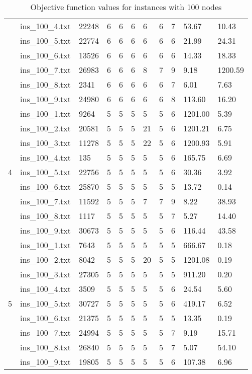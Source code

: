 \begin{table}[]
\begin{tabular}{lllllllllll}
& ins\_100\_4.txt & 22248 & 6 & 6 & 6 & 6  & 6  & 7 &53.67  &    10.43	\\
& ins\_100\_5.txt & 22774 & 6 & 6 & 6 & 6  & 6  & 6 &21.99  &    24.31	\\
& ins\_100\_6.txt & 13526 & 6 & 6 & 6 & 6  & 6  & 6 &14.33  &    18.33	\\
& ins\_100\_7.txt & 26983 & 6 & 6 & 6 & 8  & 7  & 9 &9.18   &    1200.59	\\
& ins\_100\_8.txt & 2341  & 6 & 6 & 6 & 6  & 6  & 7 &6.01   &    7.63	\\
& ins\_100\_9.txt & 24980 & 6 & 6 & 6 & 6  & 6  & 8 &113.60 &    16.20	\\
\hline 
\multirow{9}{*}{4}
& ins\_100\_1.txt & 9264  & 5 & 5 & 5 & 5  & 5  & 6 &1201.00&	5.39 \\
& ins\_100\_2.txt & 20581 & 5 & 5 & 5 & 21 & 5  & 6 &1201.21&	6.75 \\
& ins\_100\_3.txt & 11278 & 5 & 5 & 5 & 22 & 5  & 6 &1200.93&	5.91 \\
& ins\_100\_4.txt & 135   & 5 & 5 & 5 & 5  & 5  & 6 &165.75 &    6.69 \\
& ins\_100\_5.txt & 22756 & 5 & 5 & 5 & 5  & 5  & 6 &30.36  &    3.92 \\
& ins\_100\_6.txt & 25870 & 5 & 5 & 5 & 5  & 5  & 5 &13.72  &    0.14 \\
& ins\_100\_7.txt & 11592 & 5 & 5 & 5 & 7  & 7  & 9 &8.22   &    38.93\\
& ins\_100\_8.txt & 1117  & 5 & 5 & 5 & 5  & 5  & 7 &5.27   &    14.40\\
& ins\_100\_9.txt & 30673 & 5 & 5 & 5 & 5  & 5  & 6 &116.44 &    43.58\\
\hline 
\multirow{9}{*}{5}
& ins\_100\_1.txt & 7643  & 5 & 5 & 5 & 5  & 5  & 5 &666.67	&0.18	\\
& ins\_100\_2.txt & 8042  & 5 & 5 & 5 & 20 & 5  & 5 &1201.08	&0.19	\\
& ins\_100\_3.txt & 27305 & 5 & 5 & 5 & 5  & 5  & 5 &911.20	&0.20	\\
& ins\_100\_4.txt & 3509  & 5 & 5 & 5 & 5  & 5  & 6 &24.54	&5.60	\\
& ins\_100\_5.txt & 30727 & 5 & 5 & 5 & 5  & 5  & 6 &419.17	&6.52	\\
& ins\_100\_6.txt & 21375 & 5 & 5 & 5 & 5  & 5  & 5 &13.35	&0.19	\\
& ins\_100\_7.txt & 24994 & 5 & 5 & 5 & 5  & 5  & 7 &9.19	&15.71	\\
& ins\_100\_8.txt & 26840 & 5 & 5 & 5 & 5  & 5  & 7 &5.07	&54.10	\\
& ins\_100\_9.txt & 19805 & 5 & 5 & 5 & 5  & 5  & 6 &107.38	&6.96	
\end{tabular}
\caption{Objective function values for instances with 100 nodes}
\label{tab:ins100}
\end{table}

